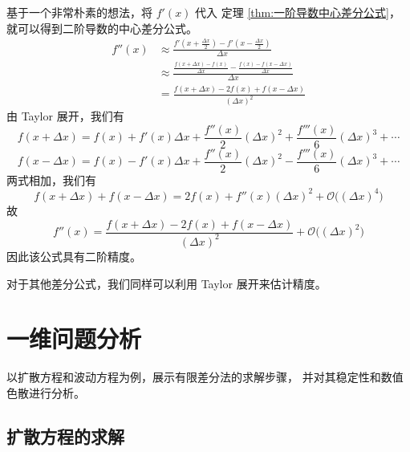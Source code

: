 \begin{solution}
    基于一个非常朴素的想法，将 $f'(x)$ 代入 
    定理 \ref{thm:一阶导数中心差分公式}，就可以得到二阶导数的中心差分公式。
    \begin{align*}
        f''(x)&\approx\frac{f'(x+\frac{\Delta x}{2})-f'(x-\frac{\Delta x}{2})}{\Delta x}\\
        &\approx\frac{\frac{f(x+\Delta x)-f(x)}{\Delta x}
            -\frac{f(x)-f(x-\Delta x)}{\Delta x}}{\Delta x}\\
        &=\frac{f(x+\Delta x)-2f(x)+f(x-\Delta x)}{(\Delta x)^2}
    \end{align*}
    由 Taylor 展开，我们有
    \begin{equation*}
        f(x+\Delta x)=f(x)+f'(x)\Delta x+\frac{f''(x)}{2}(\Delta x)^2
            +\frac{f'''(x)}{6}(\Delta x)^3+\cdots
    \end{equation*}
    \begin{equation*}
        f(x-\Delta x)=f(x)-f'(x)\Delta x+\frac{f''(x)}{2}(\Delta x)^2
            -\frac{f'''(x)}{6}(\Delta x)^3+\cdots
    \end{equation*}
    两式相加，我们有
    \begin{equation*}
        f(x+\Delta x)+f(x-\Delta x)=2f(x)+f''(x)(\Delta x)^2 
        +\mathcal{O}\Big((\Delta x)^4\Big)
    \end{equation*}
    故
    \begin{equation*}
        f''(x)=\frac{f(x+\Delta x)-2f(x)+f(x-\Delta x)}{(\Delta x)^2}
        +\mathcal{O}\Big((\Delta x)^2\Big)
    \end{equation*}
    因此该公式具有二阶精度。
\end{solution}

\par 对于其他差分公式，我们同样可以利用 Taylor 展开来估计精度。

\section{一维问题分析}

\par 以扩散方程和波动方程为例，展示有限差分法的求解步骤，
并对其稳定性和数值色散进行分析。

\subsection{扩散方程的求解}

